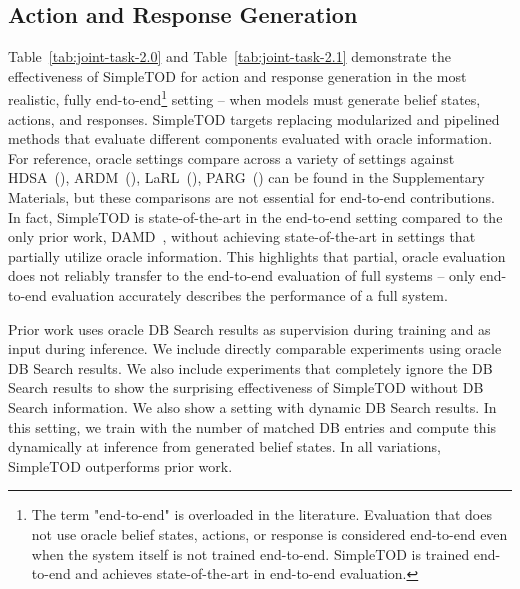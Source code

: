 \documentclass{article}
\begin{document}
\subsection{Action and Response Generation}
\label{ssec:action_and_response}
Table~\ref{tab:joint-task-2.0} and Table~\ref{tab:joint-task-2.1} demonstrate the effectiveness of SimpleTOD for action and response generation in the most realistic, fully end-to-end\footnote{The term "end-to-end" is overloaded in the literature. 
Evaluation that does not use oracle belief states, actions, or response is considered end-to-end even when the system itself is not trained end-to-end. 
SimpleTOD is trained end-to-end and achieves state-of-the-art in end-to-end evaluation.} setting -- when models must generate belief states, actions, and responses. 
SimpleTOD targets replacing modularized and pipelined methods that evaluate different components evaluated with oracle information.
For reference, oracle settings compare across a variety of settings against HDSA~(\cite{HDSA2019chen}), ARDM~(\cite{wu2019alternating}), LaRL~(\cite{zhao2019rethinking}), PARG~(\cite{gao2020paraphrase}) can be found in the Supplementary Materials, but these comparisons are not essential for end-to-end contributions.
In fact, SimpleTOD is state-of-the-art in the end-to-end setting compared to the only prior work, DAMD~\citep{DAMD2019zhang}, without achieving state-of-the-art in settings that partially utilize oracle information.
This highlights that partial, oracle evaluation does not reliably transfer to the end-to-end evaluation of full systems -- only end-to-end evaluation accurately describes the performance of a full system.

\iffalse
We report results in Table~\ref{tab:joint-task} and  for three different settings regularly employed in the literature.
These settings are determined by how much oracle information is used.
The first setting uses oracle belief states and oracle actions.
The second uses oracle belief states, but requires the system to generate its own actions.
The third requires the system to generate its own belief states and its own actions.
\fi

Prior work uses oracle DB Search results as supervision during training and as input during inference.
We include directly comparable experiments using oracle DB Search results.
We also include experiments that completely ignore the DB Search results to show the surprising effectiveness of SimpleTOD without DB Search information.
We also show a setting with dynamic DB Search results.
In this setting, 
we train with the number of matched DB entries and compute this dynamically at inference from generated belief states.
In all variations,
SimpleTOD outperforms prior work.
\end{document}
